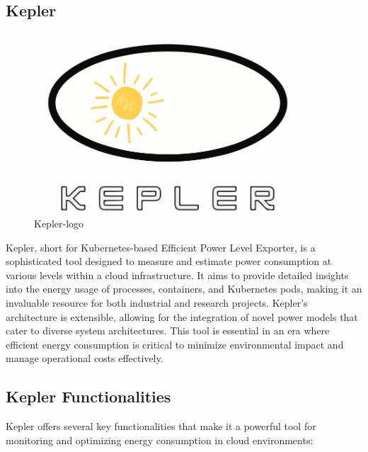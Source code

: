 \subsection{Kepler}

\begin{figure}[H]
  \centering
  \includegraphics[width=10cm]{Logos/kepler-logo.png}
  \caption[]{Kepler-logo}
\end{figure}
Kepler, short for Kubernetes-based Efficient Power Level Exporter, is a sophisticated tool designed to measure and estimate power consumption at various levels within a cloud infrastructure. It aims to provide detailed insights into the energy usage of processes, containers, and Kubernetes pods, making it an invaluable resource for both industrial and research projects. Kepler’s architecture is extensible, allowing for the integration of novel power models that cater to diverse system architectures. This tool is essential in an era where efficient energy consumption is critical to minimize environmental impact and manage operational costs effectively.

\subsection{Kepler Functionalities}

Kepler offers several key functionalities that make it a powerful tool for monitoring and optimizing energy consumption in cloud environments:

